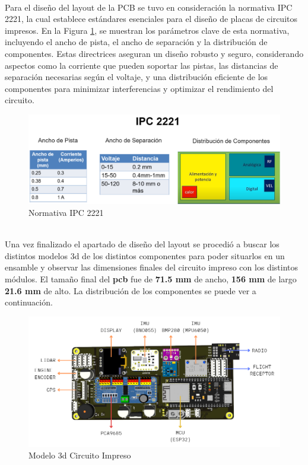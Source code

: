 \\
Para el diseño del layout de la PCB se tuvo en consideración la normativa IPC 2221, la cual establece estándares esenciales para el diseño de placas de circuitos impresos. En la Figura \ref{fig:ipc2221}, se muestran los parámetros clave de esta normativa, incluyendo el ancho de pista, el ancho de separación y la distribución de componentes. Estas directrices aseguran un diseño robusto y seguro, considerando aspectos como la corriente que pueden soportar las pistas, las distancias de separación necesarias según el voltaje, y una distribución eficiente de los componentes para minimizar interferencias y optimizar el rendimiento del circuito.\cite{IPC} \\

\begin{figure}[H]
    \centering
    \includegraphics[width=\textwidth]{Imagenes/Metodologia/ipc2221.png}
    \caption{Normativa IPC 2221 \cite{IPC} }
    \label{fig:ipc2221}
\end{figure}

\\
Una vez finalizado el apartado de diseño del layout se procedió a buscar los distintos modelos 3d de los distintos componentes para poder situarlos en un ensamble y observar las dimensiones finales del circuito impreso con los distintos módulos. El tamaño final del \textbf{pcb} fue de \textbf{71.5 mm} de ancho, \textbf{156 mm} de largo \textbf{21.6 mm} de alto. La distribución de los componentes se puede ver a continuación. 
\begin{figure}[H]
    \centering
    \includegraphics[width=\textwidth]{Imagenes/Metodologia/model3d.png}
    \caption{Modelo 3d Circuito Impreso}
    \label{fig:model3d_pcb}
\end{figure}

